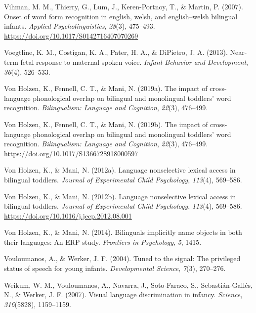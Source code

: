 \documentclass[
  12pt,
  b5paperpaper,
  twoside]{scrreprt}
\newlength{\cslhangindent}
\newlength{\cslentryspacingunit} %
\newenvironment{CSLReferences}[2] %
 {%
  \setlength{\parindent}{0pt}
  \ifodd #1
  \let\oldpar\par
  \def\par{\hangindent=\cslhangindent\oldpar}
  \fi
  \setlength{\parskip}{#2\cslentryspacingunit}
 }%
 {}
\begin{document}
\begin{CSLReferences}{1}{0}
\leavevmode{}%
Vihman, M. M., Thierry, G., Lum, J., Keren-Portnoy, T., \& Martin, P.
(2007). Onset of word form recognition in english, welsh, and
english--welsh bilingual infants. \emph{Applied Psycholinguistics},
\emph{28}(3), 475--493. \url{https://doi.org/10.1017/S0142716407070269}

\leavevmode{}%
Voegtline, K. M., Costigan, K. A., Pater, H. A., \& DiPietro, J. A.
(2013). Near-term fetal response to maternal spoken voice. \emph{Infant
Behavior and Development}, \emph{36}(4), 526--533.

\leavevmode{}%
Von Holzen, K., Fennell, C. T., \& Mani, N. (2019a). The impact of
cross-language phonological overlap on bilingual and monolingual
toddlers' word recognition. \emph{Bilingualism: Language and Cognition},
\emph{22}(3), 476--499.

\leavevmode{}%
Von Holzen, K., Fennell, C. T., \& Mani, N. (2019b). The impact of
cross-language phonological overlap on bilingual and monolingual
toddlers' word recognition. \emph{Bilingualism: Language and Cognition},
\emph{22}(3), 476--499. \url{https://doi.org/10.1017/S1366728918000597}

\leavevmode{}%
Von Holzen, K., \& Mani, N. (2012a). Language nonselective lexical
access in bilingual toddlers. \emph{Journal of Experimental Child
Psychology}, \emph{113}(4), 569--586.

\leavevmode{}%
Von Holzen, K., \& Mani, N. (2012b). Language nonselective lexical
access in bilingual toddlers. \emph{Journal of Experimental Child
Psychology}, \emph{113}(4), 569--586.
\url{https://doi.org/10.1016/j.jecp.2012.08.001}

\leavevmode{}%
Von Holzen, K., \& Mani, N. (2014). Bilinguals implicitly name objects
in both their languages: An ERP study. \emph{Frontiers in Psychology},
\emph{5}, 1415.

\leavevmode{}%
Vouloumanos, A., \& Werker, J. F. (2004). Tuned to the signal: The
privileged status of speech for young infants. \emph{Developmental
Science}, \emph{7}(3), 270--276.

\leavevmode{}%
Weikum, W. M., Vouloumanos, A., Navarra, J., Soto-Faraco, S.,
Sebastián-Gallés, N., \& Werker, J. F. (2007). Visual language
discrimination in infancy. \emph{Science}, \emph{316}(5828), 1159--1159.


\end{CSLReferences}
\end{document}
